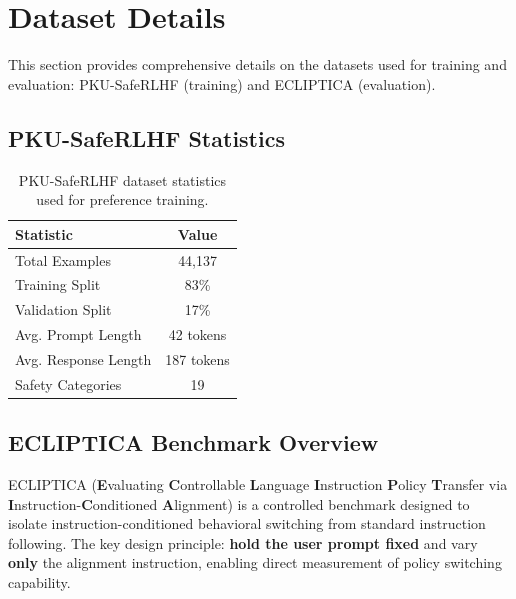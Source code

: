 \section{Dataset Details}
\label{sec:appendix_dataset}

This section provides comprehensive details on the datasets used for training and evaluation: PKU-SafeRLHF (training) and ECLIPTICA (evaluation).

\subsection{PKU-SafeRLHF Statistics}

\begin{table}[H]
\centering
\small
\renewcommand{\arraystretch}{1.2}
\begin{tabular}{@{}lc@{}}
\toprule
\textbf{Statistic} & \textbf{Value} \\
\midrule
Total Examples & 44,137 \\ \hline
Training Split & 83\% \\ \hline
Validation Split & 17\% \\ \hline
Avg. Prompt Length & 42 tokens \\ \hline
Avg. Response Length & 187 tokens \\ \hline
Safety Categories & 19 \\
\bottomrule
\end{tabular}
\caption{PKU-SafeRLHF dataset statistics used for preference training.}
\label{tab:pku_stats}
\end{table}

\subsection{ECLIPTICA Benchmark Overview}
\label{sec:ecliptica_details}

ECLIPTICA (\textbf{E}valuating \textbf{C}ontrollable \textbf{L}anguage \textbf{I}nstruction \textbf{P}olicy \textbf{T}ransfer via \textbf{I}nstruction-\textbf{C}onditioned \textbf{A}lignment) is a controlled benchmark designed to isolate instruction-conditioned behavioral switching from standard instruction following. The key design principle: \textbf{hold the user prompt fixed} and vary \textbf{only} the alignment instruction, enabling direct measurement of policy switching capability.


